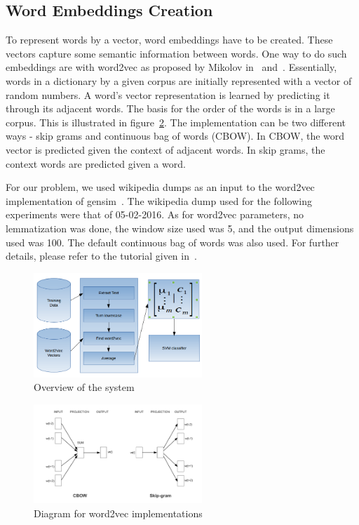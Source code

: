\documentclass[conference]{IEEEtran}
\begin{document}
\subsection{Word Embeddings Creation}
To represent words by a vector, word embeddings have to be created. These vectors capture some semantic information between words. One way to do such embeddings are with word2vec as proposed by Mikolov in~\cite{mikolov2013efficient} and~\cite{mikolov2013distributed}. Essentially, words in a dictionary by a given corpus are initially represented with a vector of random numbers. A word's vector representation is learned by predicting it through its adjacent words. The basis for the order of the words is in a large corpus. This is illustrated in figure~\ref{SkipCBOW}. The implementation can be two different ways - skip grams and continuous bag of words (CBOW). In CBOW, the word vector is predicted given the context of adjacent words. In skip grams, the context words are predicted given a word. 

For our problem, we used wikipedia dumps as an input to the word2vec implementation of gensim~\cite{rehurek_lrec}. The wikipedia dump used for the following experiments were that of 05-02-2016. As for word2vec parameters, no lemmatization was done, the window size used was 5, and the output dimensions used was 100. The default continuous bag of words was also used. For further details, please refer to the tutorial given in~\cite{TrainWord2Vec}.

\begin{figure}
\centering
\includegraphics[width=2.5in]{System.png}
\caption{Overview of the system}
\label{System}
\end{figure}

\begin{figure}
\centering

\includegraphics[width=2.5in]{sentiment_01_large.png}
\caption{Diagram for word2vec implementations}
\label{SkipCBOW}
\end{figure}
\end{document}
